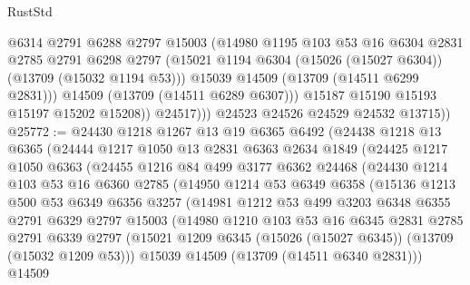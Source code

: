 \begin{lexlean}{RustStd}
\begin{coremodule}
                    @6314
                    @2791
                    @6288
                    @2797
                    @15003
                    (@14980
                      @1195
                      @103
                      @53
                      @16
                      @6304
                      @2831
                      @2785
                      @2791
                      @6298
                      @2797
                      (@15021 @1194 @6304 (@15026 (@15027 @6304)) (@13709 (@15032 @1194 @53)))
                      @15039
                      @14509
                      (@13709 (@14511 @6299 @2831)))
                    @14509
                    (@13709 (@14511 @6289 @6307)))
                  @15187
                  @15190
                  @15193
                  @15197
                  @15202
                  @15208))
              @24517)))
        @24523
        @24526
        @24529
        @24532
        @13715))
@25772 := @24430
    @1218
    @1267
    @13
    @19
    @6365
    @6492
    (@24438
      @1218
      @13
      @6365
      (@24444
        @1217
        @1050
        @13
        @2831
        @6363
        @2634
        @1849
        (@24425
          @1217
          @1050
          @6363
          (@24455
            @1216
            @84
            @499
            @3177
            @6362
            @24468
            (@24430
              @1214
              @103
              @53
              @16
              @6360
              @2785
              (@14950
                @1214
                @53
                @6349
                @6358
                (@15136
                  @1213
                  @500
                  @53
                  @6349
                  @6356
                  @3257
                  (@14981
                    @1212
                    @53
                    @499
                    @3203
                    @6348
                    @6355
                    @2791
                    @6329
                    @2797
                    @15003
                    (@14980
                      @1210
                      @103
                      @53
                      @16
                      @6345
                      @2831
                      @2785
                      @2791
                      @6339
                      @2797
                      (@15021 @1209 @6345 (@15026 (@15027 @6345)) (@13709 (@15032 @1209 @53)))
                      @15039
                      @14509
                      (@13709 (@14511 @6340 @2831)))
                    @14509

\end{coremodule}
\end{lexlean}

